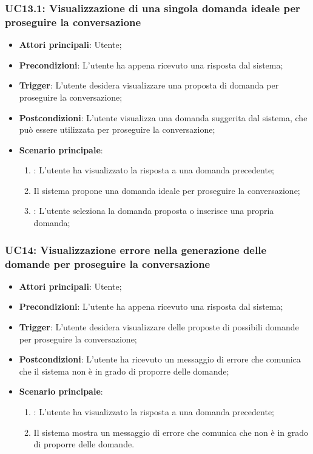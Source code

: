\hypertarget{UC13.1}{}
\subsubsection{UC13.1: Visualizzazione di una singola domanda ideale per proseguire la conversazione}
\begin{itemize}
    \item \textbf{Attori principali}: Utente;
    \item \textbf{Precondizioni}: L'utente ha appena ricevuto una risposta dal sistema;
    \item \textbf{Trigger}: L'utente desidera visualizzare una proposta di domanda per proseguire la conversazione;
    \item \textbf{Postcondizioni}: L'utente visualizza una domanda suggerita dal sistema, che può essere utilizzata per proseguire la conversazione;
    \item \textbf{Scenario principale}:
    \begin{enumerate}
        \item {}: L'utente ha visualizzato la risposta a una domanda precedente;
        \item Il sistema propone una domanda ideale per proseguire la conversazione;
        \item {}: L'utente seleziona la domanda proposta o inserisce una propria domanda;
    \end{enumerate}
\end{itemize}

\hypertarget{UC14}{}
\subsubsection{UC14: Visualizzazione errore nella generazione delle domande per proseguire la conversazione}
\begin{itemize}
    \item \textbf{Attori principali}: Utente;
    \item \textbf{Precondizioni}: L'utente ha appena ricevuto una risposta dal sistema;
    \item \textbf{Trigger}: L'utente desidera visualizzare delle proposte di possibili domande per proseguire la conversazione;
    \item \textbf{Postcondizioni}: L'utente ha ricevuto un messaggio di errore che comunica che il sistema non è in grado di proporre delle domande;
    \item \textbf{Scenario principale}:
    \begin{enumerate}
        \item {}: L'utente ha visualizzato la risposta a una domanda precedente;
        \item Il sistema mostra un messaggio di errore che comunica che non è in grado di proporre delle domande.
    \end{enumerate}
\end{itemize}


